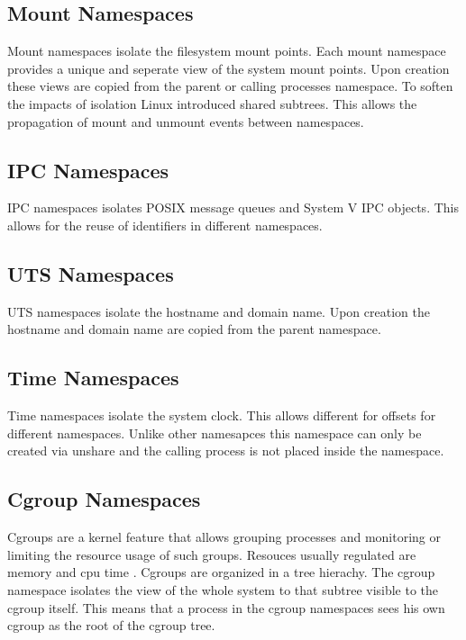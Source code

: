 \documentclass[10pt,twocolumn,a4paper]{article}
\begin{document}
\subsection{Mount Namespaces}
Mount namespaces isolate the filesystem mount points. 
Each mount namespace provides a unique and seperate view of the system mount points. 
Upon creation these views are copied from the parent or calling processes namespace.
To soften the impacts of isolation Linux introduced shared subtrees. This allows the propagation of
mount and unmount events between namespaces.\cite{12}

\subsection{IPC Namespaces}
IPC namespaces isolates POSIX message queues and System V IPC objects. This allows for the reuse of identifiers
in different namespaces.\cite{13}

\subsection{UTS Namespaces}
UTS namespaces isolate the hostname and domain name. Upon creation the hostname and domain name are copied from the parent namespace.\cite{14}

\subsection{Time Namespaces}
Time namespaces isolate the system clock. This allows different for offsets for different namespaces.
Unlike other namesapces this namespace can only be created via unshare and the calling process is
not placed inside the namespace.\cite{15}

\subsection{Cgroup Namespaces}
Cgroups are a kernel feature that allows  grouping processes and monitoring or limiting the resource usage
of such groups. Resouces usually regulated are memory and cpu time \cite{16}. Cgroups are
organized in a tree hierachy. The cgroup namespace isolates the view of the whole system to
that subtree visible to the cgroup itself. This means that a process
in the cgroup namespaces sees his own cgroup as the root of the cgroup tree. \cite{17}
\end{document}
